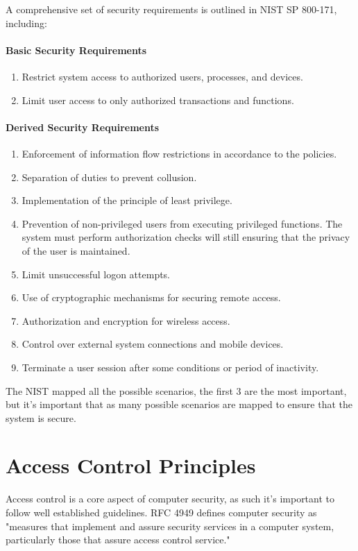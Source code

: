 A comprehensive set of security requirements is outlined in NIST SP
800-171, including:

\paragraph{Basic Security Requirements}
\begin{enumerate}
    \item Restrict system access to authorized users, processes, and devices.
    \item Limit user access to only authorized transactions and functions.
\end{enumerate}

\paragraph{Derived Security Requirements}

\begin{enumerate}
    \item Enforcement of information flow restrictions in accordance
      to the policies.
    \item Separation of duties to prevent collusion.
    \item Implementation of the principle of least privilege.
    \item Prevention of non-privileged users from executing privileged
      functions.
      \subitem The system must perform authorization checks will still
      ensuring that the privacy of the user is maintained.
    \item Limit unsuccessful logon attempts.
    \item Use of cryptographic mechanisms for securing remote access.
    \item Authorization and encryption for wireless access.
    \item Control over external system connections and mobile devices.
    \item Terminate a user session after some conditions or period of
      inactivity.
\end{enumerate}

The NIST mapped all the possible scenarios, the first 3 are the most
important, but it's important that as many possible scenarios are
mapped to ensure that the system is secure.

\section{Access Control Principles}
Access control is a core aspect of computer security, as such it's
important to follow well established guidelines. RFC 4949 defines
computer security as "measures that implement and assure security
services in a computer system, particularly those that assure access
control service."

